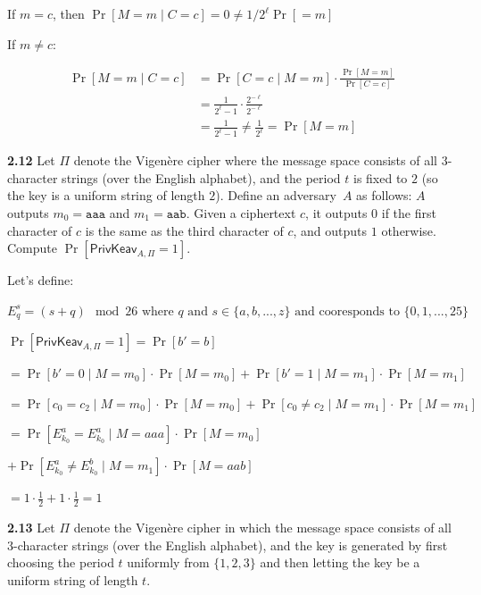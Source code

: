 	If $m = c$, then $\Pr[M = m \mid C = c] = 0 \ne 1 / 2^\ell \Pr[ = m]$
	
	If $m \ne c$:
	
	\[
	\begin{aligned}
		\Pr[M = m \mid C = c]
		&= \Pr[C = c \mid M = m] \cdot \frac{\Pr[M = m]}{\Pr[C = c]} \\
		&= \frac{1}{2^\ell - 1} \cdot \frac{2^{-\ell}}{2^{-\ell}} \\
		&= \frac{1}{2^\ell - 1} \ne \frac{1}{2^\ell} = \Pr[M = m]
	\end{aligned}
	\]
	
\newpage
\noindent
\textbf{2.12} \hspace{1em} Let $\Pi$ denote the Vigenère cipher where the message space consists of all \(3\)-character strings (over the English alphabet), and the period \(t\) is fixed to \(2\) (so the key is a uniform string of length \(2\)). Define an adversary~\(A\) as follows: \(A\) outputs \(m_{0} = \texttt{aaa}\) and \(m_{1} = \texttt{aab}\). Given a ciphertext \(c\), it outputs \(0\) if the first character of \(c\) is the same as the third character of \(c\), and outputs \(1\) otherwise. Compute $\Pr[\mathsf{PrivKeav}_{A,\Pi}=1]$.
\vspace{1em}

Let's define:

$E_{q}^{s}  = (s + q) \mod{26} \text{ where } q \text{ and } s \in \{a, b, ..., z\} \text{ and cooresponds to } \{0, 1, ..., 25\}$

$\Pr[\mathsf{PrivKeav}_{A,\Pi}=1] = \Pr[b' = b]$

$= \Pr[b' = 0 \mid M = m_0] \cdot \Pr[M = m_0] + \Pr[b' = 1 \mid M = m_1] \cdot \Pr[M = m_1]$

$= \Pr[c_0 = c_2  \mid M = m_0] \cdot \Pr[M = m_0] + \Pr[c_0 \ne c_2   \mid M = m_1] \cdot \Pr[M = m_1]$

$= \Pr[E_{k_0}^{a} = E_{k_0}^{a}  \mid M = aaa] \cdot \Pr[M = m_0]$

$+ \Pr[E_{k_0}^{a} \ne E_{k_0}^{b}   \mid M = m_1] \cdot \Pr[M = aab]$

$= 1 \cdot \frac{1}{2} + 1 \cdot \frac{1}{2} = 1$


\newpage
\noindent
\textbf{2.13} \hspace{1em}Let $\Pi$ denote the Vigen\`ere cipher in which the message space consists of all 3-character strings (over the English alphabet), and the key is generated by first choosing the period $t$ uniformly from $\{1,2,3\}$ and then letting the key be a uniform string of length $t$.
\vspace{1em}


